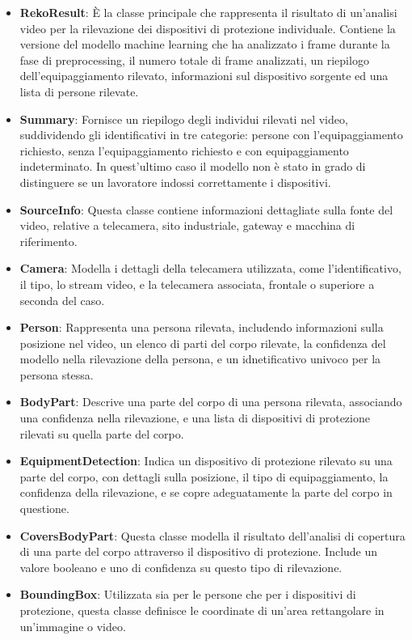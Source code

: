 \begin{itemize}
	\item \textbf{RekoResult}: È la classe principale che rappresenta il risultato di un'analisi video per la rilevazione dei dispositivi di protezione individuale. Contiene la versione del modello machine learning che ha analizzato i frame durante la fase di preprocessing, il numero totale di frame analizzati, un riepilogo dell'equipaggiamento rilevato, informazioni sul dispositivo sorgente ed una lista di persone rilevate.
	\item \textbf{Summary}: Fornisce un riepilogo degli individui rilevati nel video, suddividendo gli identificativi in tre categorie: persone con l'equipaggiamento richiesto, senza l'equipaggiamento richiesto e con equipaggiamento indeterminato. In quest'ultimo caso il modello non è stato in grado di distinguere se un lavoratore indossi correttamente i dispositivi.
	\item \textbf{SourceInfo}: Questa classe contiene informazioni dettagliate sulla fonte del video, relative a telecamera, sito industriale, gateway e macchina di riferimento.
	\item \textbf{Camera}: Modella i dettagli della telecamera utilizzata, come l'identificativo, il tipo, lo stream video, e la telecamera associata, frontale o superiore a seconda del caso.
	\item \textbf{Person}: Rappresenta una persona rilevata, includendo informazioni sulla posizione nel video, un elenco di parti del corpo rilevate, la confidenza del modello nella rilevazione della persona, e un idnetificativo univoco per la persona stessa.
	\item \textbf{BodyPart}: Descrive una parte del corpo di una persona rilevata, associando una confidenza nella rilevazione, e una lista di dispositivi di protezione rilevati su quella parte del corpo.
	\item \textbf{EquipmentDetection}: Indica un dispositivo di protezione rilevato su una parte del corpo, con dettagli sulla posizione, il tipo di equipaggiamento, la confidenza della rilevazione, e se copre adeguatamente la parte del corpo in questione.
	\item \textbf{CoversBodyPart}: Questa classe modella il risultato dell'analisi di copertura di una parte del corpo attraverso il dispositivo di protezione. Include un valore booleano e uno di confidenza su questo tipo di rilevazione.
	\item \textbf{BoundingBox}: Utilizzata sia per le persone che per i dispositivi di protezione, questa classe definisce le coordinate di un'area rettangolare in un'immagine o video.
\end{itemize}


